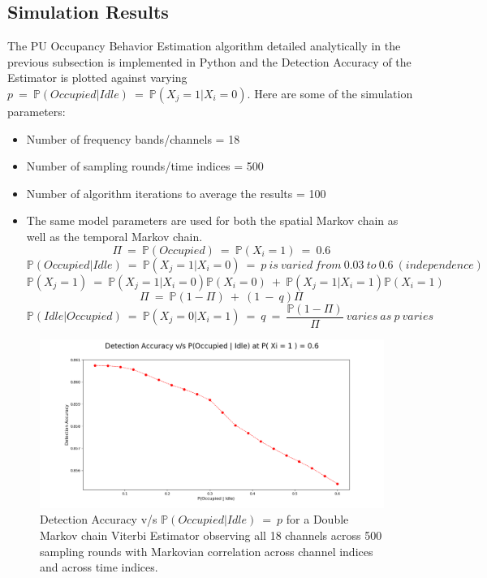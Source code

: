 \documentclass[12pt, draftcls, onecolumn]{IEEEtran}
\begin{document}
\subsection{Simulation Results}
The PU Occupancy Behavior Estimation algorithm detailed analytically in the previous subsection is implemented in Python and the Detection Accuracy of the Estimator is plotted against varying $p\ =\ \mathbb P(Occupied|Idle)\ =\ \mathbb P(X_j=1|X_i=0)$. Here are some of the simulation parameters:
\begin{itemize}
    \item Number of frequency bands/channels = 18
    \item Number of sampling rounds/time indices = 500
    \item Number of algorithm iterations to average the results = 100
    \item The same model parameters are used for both the spatial Markov chain as well as the temporal Markov chain.
    \[\Pi\ =\ \mathbb P(Occupied)\ =\ \mathbb P(X_i=1)\ =\ 0.6\]
    \[\mathbb P(Occupied|Idle)\ =\ \mathbb P(X_j=1|X_i=0)\ =\ p\ is\ varied\ from\ 0.03\ to\ 0.6\ (independence)\]
    \[\mathbb P(X_j=1)\ =\ \mathbb P(X_j=1|X_i=0)\mathbb P(X_i=0)\ +\ \mathbb P(X_j=1|X_i=1)\mathbb P(X_i=1)\]
    \[\Pi\ =\ \mathbb P(1-\Pi)\ +\ (1\ -\ q)\Pi\]
    \[\mathbb P(Idle|Occupied)\ =\ \mathbb P(X_j=0|X_i=1)\ =\ q\ =\ \frac{\mathbb P(1-\Pi)}{\Pi}\ varies\ as\ p\ varies\]
\end{itemize}
\begin{figure}[t]
\includegraphics[width=1.0\textwidth]{Detection_Accuracy_vs_p_Iteration_1.png}
\caption{Detection Accuracy v/s $\mathbb P(Occupied|Idle)\ =\ p$ for a Double Markov chain Viterbi Estimator observing all 18 channels across 500 sampling rounds with Markovian correlation across channel indices and across time indices.}
\label{fig:mesh11}
\centering
\end{figure}
\end{document}
